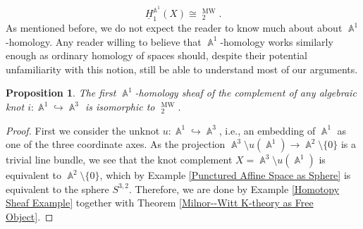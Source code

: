 \documentclass[english]{amsart}
\newtheorem{prop}{Proposition}[section]
\theoremstyle{definition}
\DeclareMathOperator{\A}{\mathbb{A}}
\DeclareMathOperator{\KK}{\underline{K}}
\DeclareMathOperator{\MW}{MW}
\begin{document}
$$\underline{H}_1^{\A^1}\!(X) \cong \KK^{\MW}_2.$$
As mentioned before, we do not expect the reader to know much about about $\A^1$-homology. Any reader willing to believe that $\A^1$-homology works similarly enough as ordinary homology of spaces should, despite their potential unfamiliarity with this notion, still be able to understand most of our arguments.
\begin{prop}\label{Homology of Knot Complement}
The first $\A^1$-homology sheaf of the complement of any algebraic knot $i \colon \A^1 \hookrightarrow \A^3$ is isomorphic to $\KK^{\MW}_2$.
\end{prop}
\begin{proof}
First we consider the unknot $u \colon \A^1 \hookrightarrow \A^3$, i.e., an embedding of $\A^1$ as one of the three coordinate axes. As the projection $\A^3 \setminus u(\A^1) \rightarrow \A^2 \setminus \lbrace 0 \rbrace$ is a trivial line bundle, we see that the knot complement $X = \A^3 \setminus u(\A^1)$ is equivalent to $\A^2 \setminus \lbrace 0 \rbrace$, which by Example \ref{Punctured Affine Space as Sphere} is equivalent to the sphere $S^{3,2}$. Therefore, we are done by Example \ref{Homotopy Sheaf Example} together with Theorem \ref{Milnor--Witt K-theory as Free Object}.


\end{proof}
\end{document}
